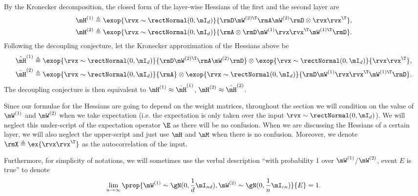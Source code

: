 By the Kronecker decomposition, the closed form of the layer-wise Hessians of the first and the second layer are\begin{align*}
    \mH^{(1)} &\triangleq \exop{\rvx\sim \rectNormal(0, \mI_d)}{\rmD\mW^{(2)\T}\rmA\mW^{(2)}\rmD\otimes \rvx\rvx^\T},\\
    \mH^{(2)} &\triangleq \exop{\rvx\sim \rectNormal(0, \mI_d)}{\rmA\otimes \rmD\mW^{(1)}\rvx\rvx^\T\mW^{(1)\T}\rmD}.
\end{align*}
Following the decoupling conjecture, let the Kronecker approximation of the Hessians above be\begin{align*}
    \hat\mH^{(1)} &\triangleq \exop{\rvx\sim \rectNormal(0, \mI_d)}{\rmD\mW^{(2)\T}\rmA\mW^{(2)}\rmD}\otimes\exop{\rvx\sim \rectNormal(0, \mI_d)}{\rvx\rvx^\T},\\
    \hat\mH^{(2)} &\triangleq \exop{\rvx\sim \rectNormal(0, \mI_d)}{\rmA}\otimes\exop{\rvx\sim \rectNormal(0, \mI_d)}{\rmD\mW^{(1)}\rvx\rvx^\T\mW^{(1)\T}\rmD}.
\end{align*}
The decoupling conjecture is then equivalent to $\mH^{(1)}\approx \hat\mH^{(1)}$, $\mH^{(2)}\approx \hat\mH^{(2)}$.

Since our formulae for the Hessians are going to depend on the weight matrices, throughout the section we will condition on the value of $\mW^{(1)}$ and $\mW^{(2)}$ when we take expectation (i.e. the expectation is only taken over the input $\rvx\sim \rectNormal(0, \mI_d)$). We will neglect this under-script of the expectation operator $\E$ as there will be no confusion. When we are discussing the Hessians of a certain layer, we will also neglect the upper-script and just use $\mH$ and $\mM$ when there is no confusion. Moreover, we denote $\rmX\triangleq\ex{\rvx\rvx^\T}$ as the autocorrelation of the input.

Furthermore, for simplicity of notations, we will sometimes use the verbal description ``with probability 1 over $\mW^{(1)}$/$\mW^{(2)}$, event $E$ is true'' to denote
\begin{equation}
    \lim_{n\to\infty}\prop{\mW^{(1)}\sim\gN(0,\frac{1}{d}\mI_{nd}), \mW^{(2)}\sim\gN(0,\frac{1}{n}\mI_{cn})}{E} = 1.
\end{equation}
